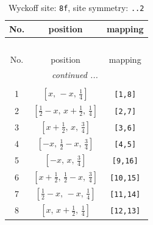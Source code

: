 \documentclass[fleqn,8pt]{jsarticle}
\begin{document}
\begin{longtable}{ccc}
\caption{Wyckoff site: {\tt 8f}, site symmetry: {\tt ..2}}
 \\
 \hline \hline
No. & position & mapping \\ \hline \endfirsthead

\multicolumn{2}{l}{\tablename\ \thetable{}} \\
 \hline \hline
No. & position & mapping \\ \hline \endhead

 \hline \hline
\multicolumn{2}{r}{\footnotesize\it continued ...} \\ \endfoot

 \hline \hline
\multicolumn{2}{r}{} \\ \endlastfoot

1 & $\left[ x,\, - x,\, \frac{1}{4} \right]$ & {\tt [1,8]} \\ \hline
2 & $\left[ \frac{1}{2} - x,\, x + \frac{1}{2},\, \frac{1}{4} \right]$ & {\tt [2,7]} \\ \hline
3 & $\left[ x + \frac{1}{2},\, x,\, \frac{3}{4} \right]$ & {\tt [3,6]} \\ \hline
4 & $\left[ - x,\, \frac{1}{2} - x,\, \frac{3}{4} \right]$ & {\tt [4,5]} \\ \hline
5 & $\left[ - x,\, x,\, \frac{3}{4} \right]$ & {\tt [9,16]} \\ \hline
6 & $\left[ x + \frac{1}{2},\, \frac{1}{2} - x,\, \frac{3}{4} \right]$ & {\tt [10,15]} \\ \hline
7 & $\left[ \frac{1}{2} - x,\, - x,\, \frac{1}{4} \right]$ & {\tt [11,14]} \\ \hline
8 & $\left[ x,\, x + \frac{1}{2},\, \frac{1}{4} \right]$ & {\tt [12,13]} \\
\end{longtable}
\renewcommand{\arraystretch}{1.2}
\end{document}
